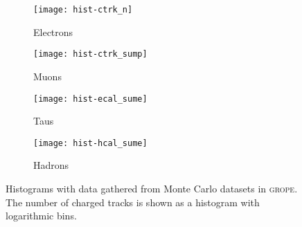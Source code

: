 \begin{figure}
    \centering
    \begin{subfigure}[c]{0.49\linewidth}
        \centering
        \texttt{[image: hist-ctrk\_n]}
        \caption{%
            Electrons
        }
        \label{fig:hist/ncharged}
    \end{subfigure}
    \hfill
    \begin{subfigure}[c]{0.49\linewidth}
        \centering
        \texttt{[image: hist-ctrk\_sump]}
        \caption{%
            Muons
        }
        \label{fig:hist/pcharged}
    \end{subfigure}

    \vspace{2ex}

    \begin{subfigure}[c]{0.49\linewidth}
        \centering
        \texttt{[image: hist-ecal\_sume]}
        \caption{%
            Taus
        }
        \label{fig:hist/eecal}
    \end{subfigure}
    \hfill
    \begin{subfigure}[c]{0.49\linewidth}
        \centering
        \texttt{[image: hist-hcal\_sume]}
        \caption{%
            Hadrons
        }
        \label{fig:hist/ehcal}
    \end{subfigure}
    \caption{%
        Histograms with data gathered from Monte Carlo datasets in
        \textsc{grope}. The number of charged tracks is shown as a histogram
        with logarithmic bins.
    }
    \label{fig:hist}
\end{figure}
